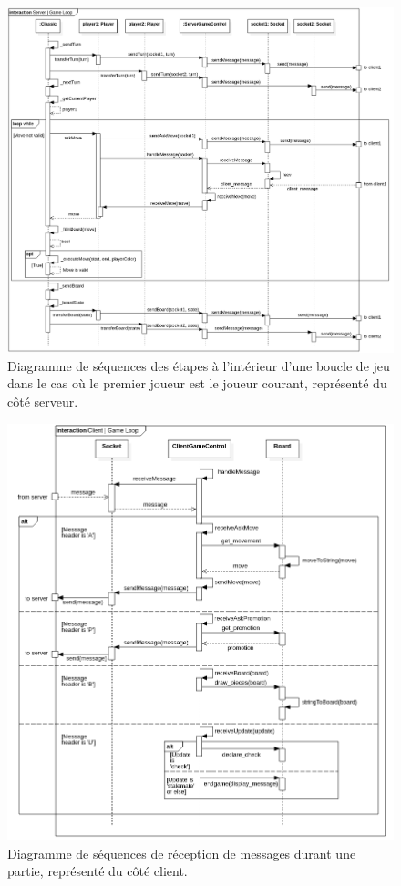 \documentclass[10pt, a4paper]{article}
\begin{document}
\begin{enumerate}
\begin{figure} [H]
\centering
\includegraphics[scale=0.40]{Sequence_Server_GameLoop.png}
\caption{Diagramme de séquences des étapes à l'intérieur d'une boucle de jeu dans le cas où le premier joueur est le joueur courant, représenté du côté serveur.}
\end{figure}

\begin{figure} [H]
\centering
\includegraphics[scale=0.40]{Sequence_Client_GameLoop.png}
\caption{Diagramme de séquences de réception de messages durant une partie, représenté du côté client.}
\end{figure}


\end{enumerate}
\end{document}

